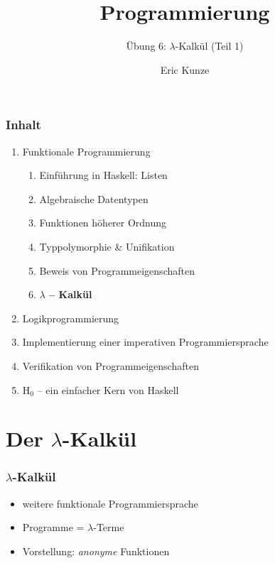 \documentclass{beamer}
\begin{document}
	
	\title{Programmierung}
	\subtitle{Übung 6: $\lambda$-Kalkül (Teil 1)}
	\author{Eric Kunze}
	\date{}
	
	\maketitle
	


\begin{frame}[fragile] \frametitle{Inhalt}
	\begin{enumerate}
		\item Funktionale Programmierung
		\begin{enumerate}
			\item Einführung in Haskell: Listen
			\item Algebraische Datentypen
			\item Funktionen höherer Ordnung
			\item Typpolymorphie \& Unifikation
			\item Beweis von Programmeigenschaften
			\item \textbf{$\lambda$ -- Kalkül}
		\end{enumerate}
		\item Logikprogrammierung
		\item Implementierung einer imperativen Programmiersprache
		\item Verifikation von Programmeigenschaften
		\item H${}_\text{0}$ -- ein einfacher Kern von Haskell
	\end{enumerate}
\end{frame}

\section{Der $\lambda$-Kalkül}

\begin{frame} \frametitle{$\lambda$-Kalkül}
	\begin{itemize}
		\item weitere funktionale Programmiersprache
		\item Programme = $\lambda$-Terme
		\item Vorstellung: \textit{anonyme} Funktionen
	\end{itemize}
\end{frame}
\end{document}
